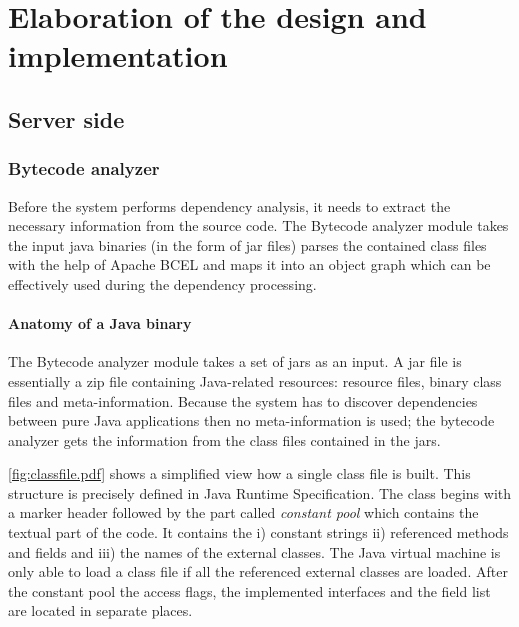 \chapter{Elaboration of the design and implementation}


\section{Server side}\label{sect:elabserver}


\subsection{Bytecode analyzer}\label{sect:bcanalyzer}
Before the system performs dependency analysis, it needs to extract the
necessary information from the source code.
The Bytecode analyzer module takes the input java binaries (in the form of jar
files) parses the contained class files with the help of Apache BCEL and maps it
into an object graph which can be effectively used during the dependency
processing.


\subsubsection{Anatomy of a Java binary}
The Bytecode analyzer module takes a set of jars as an input. A jar file is
essentially a zip file containing Java-related resources: resource files, binary
class files and meta-information. Because the system has to discover
dependencies between pure Java applications then no meta-information is used;
the bytecode analyzer gets the information from the class files contained in the
jars.
 

\autoref{fig:classfile.pdf} shows a simplified view how a single class
file is built. This structure is precisely defined in Java Runtime
Specification. The class begins with a marker header followed by the part called
\textit{constant pool} which contains the textual part of the code. It contains
the i) constant strings ii) referenced methods and fields and iii) the names of
the external classes. The Java virtual machine is only able to load a class file
if all the referenced external classes are loaded.
After the constant pool the access flags, the implemented interfaces and the
field list are located in separate places.

